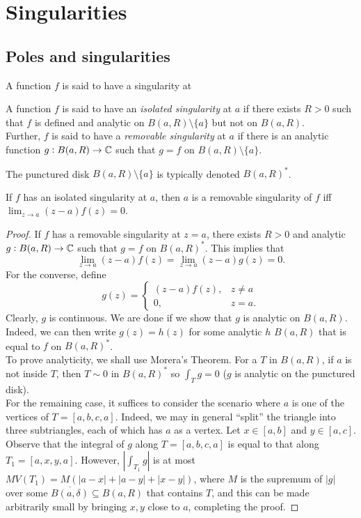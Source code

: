\section{Singularities}

	\subsection{Poles and singularities}

		A function $f$ is said to have a singularity at 

		\begin{fdef}
			A function $f$ is said to have an \emph{isolated singularity} at $a$ if there exists $R > 0$ such that $f$ is defined and analytic on $B(a,R) \setminus \{a\}$ but not on $B(a,R)$.\\
			Further, $f$ is said to have a \emph{removable singularity} at $a$ if there is an analytic function $g : B(a,R) \to \mathbb{C}$ such that $g = f$ on $B(a,R) \setminus \{a\}$.
		\end{fdef}

		The punctured disk $B(a,R) \setminus \{a\}$ is typically denoted $B(a,R)^*$.

		\begin{theorem}
			\label{theo 4.1}
			If $f$ has an isolated singularity at $a$, then $a$ is a removable singularity of $f$ iff $\lim_{z \to a} (z-a) f(z) = 0$.
		\end{theorem}
		\begin{proof}
			If $f$ has a removable singularity at $z = a$, there exists $R > 0$ and analytic $g : B(a,R) \to \mathbb{C}$ such that $g = f$ on $B(a,R)^*$. This implies that
			\[ \lim_{z\to a} (z-a) f(z) = \lim_{z \to a} (z-a) g(z) = 0. \]
			For the converse, define
			\[ g(z) =
			\begin{cases}
				(z-a) f(z), & z \ne a \\
				0, & z=a.	
			\end{cases}
			\]
			Clearly, $g$ is continuous. We are done if we show that $g$ is analytic on $B(a,R)$. Indeed, we can then write $g(z) = h(z)$ for some analytic $h$ $B(a,R)$ that is equal to $f$ on $B(a,R)^*$.\\
			To prove analyticity, we shall use Morera's Theorem. For a $T$ in $B(a,R)$, if $a$ is not inside $T$, then $T \sim 0$ in $B(a,R)^*$ so $\int_T g = 0$ ($g$ is analytic on the punctured disk).\\
			For the remaining case, it suffices to consider the scenario where $a$ is one of the vertices of $T = [a,b,c,a]$. Indeed, we may in general ``split'' the triangle into three subtriangles, each of which has $a$ as a vertex. Let $x \in [a,b]$ and $y \in [a,c]$. Observe that the integral of $g$ along $T = [a,b,c,a]$ is equal to that along $T_1 = [a,x,y,a]$. However, $\left| \int_{T_1} g \right|$ is at most $M V(T_1) = M (|a-x| + |a-y| + |x-y|)$, where $M$ is the supremum of $|g|$ over some $\overline{B(a,\delta)} \subseteq B(a,R)$ that contains $T$, and this can be made arbitrarily small by bringing $x,y$ close to $a$, completing the proof.
		\end{proof}

